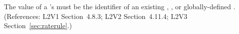 The value of a \RateRule's  must be the identifier
of an existing \Compartment, \Species, or globally-defined \Parameter.
(References: L2V1 Section~4.8.3; L2V2 Section~4.11.4; L2V3
Section~\ref{sec:raterule}.)
